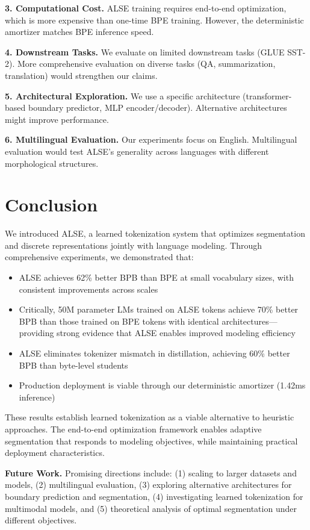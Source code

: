 \documentclass{article}
\begin{document}
\textbf{3. Computational Cost.} ALSE training requires end-to-end optimization, which is more expensive than one-time BPE training. However, the deterministic amortizer matches BPE inference speed.

\textbf{4. Downstream Tasks.} We evaluate on limited downstream tasks (GLUE SST-2). More comprehensive evaluation on diverse tasks (QA, summarization, translation) would strengthen our claims.

\textbf{5. Architectural Exploration.} We use a specific architecture (transformer-based boundary predictor, MLP encoder/decoder). Alternative architectures might improve performance.

\textbf{6. Multilingual Evaluation.} Our experiments focus on English. Multilingual evaluation would test ALSE's generality across languages with different morphological structures.

\section{Conclusion}

We introduced ALSE, a learned tokenization system that optimizes segmentation and discrete representations jointly with language modeling. Through comprehensive experiments, we demonstrated that:

\begin{itemize}
    \item ALSE achieves 62\% better BPB than BPE at small vocabulary sizes, with consistent improvements across scales
    \item Critically, 50M parameter LMs trained on ALSE tokens achieve 70\% better BPB than those trained on BPE tokens with identical architectures—providing strong evidence that ALSE enables improved modeling efficiency
    \item ALSE eliminates tokenizer mismatch in distillation, achieving 60\% better BPB than byte-level students
    \item Production deployment is viable through our deterministic amortizer (1.42ms inference)
\end{itemize}

These results establish learned tokenization as a viable alternative to heuristic approaches. The end-to-end optimization framework enables adaptive segmentation that responds to modeling objectives, while maintaining practical deployment characteristics.

\textbf{Future Work.} Promising directions include: (1) scaling to larger datasets and models, (2) multilingual evaluation, (3) exploring alternative architectures for boundary prediction and segmentation, (4) investigating learned tokenization for multimodal models, and (5) theoretical analysis of optimal segmentation under different objectives.
\end{document}

